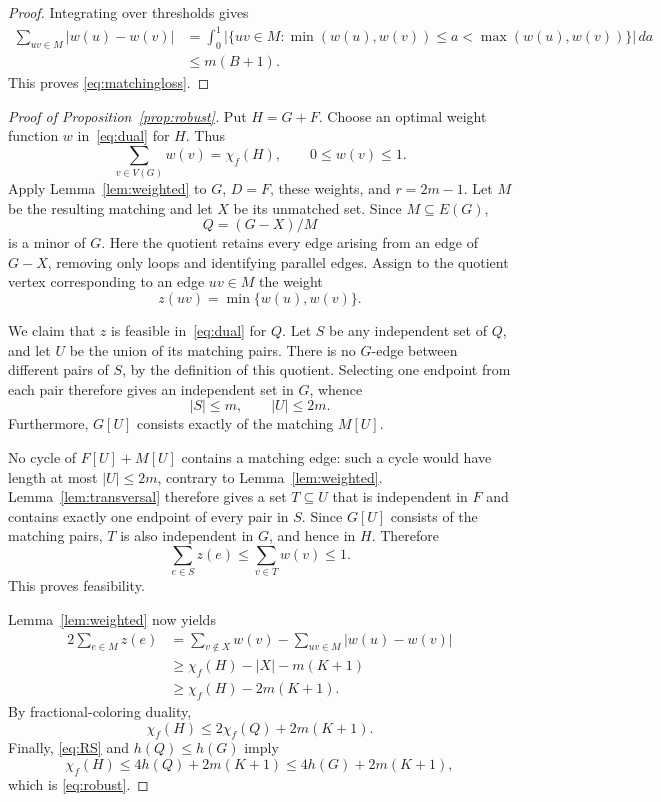 \documentclass[11pt]{article}
\begin{document}
\begin{proof}
Integrating over thresholds gives \[
\begin{aligned}
\sum_{uv\in M}|w(u)-w(v)|
&=\int_0^1
\bigl|\{uv\in M:\min(w(u),w(v))\le a<\max(w(u),w(v))\}\bigr|\,da\\
&\le m(B+1).
\end{aligned}
\] This proves \eqref{eq:matchingloss}. \end{proof}

\begin{proof}[Proof of Proposition~\ref{prop:robust}] Put \(H=G+F\). Choose an optimal
 weight function \(w\) in~\eqref{eq:dual} for \(H\). Thus \[
\sum_{v\in V(G)}w(v)=\chi_f(H),\qquad 0\le w(v)\le1.
\] Apply Lemma~\ref{lem:weighted} to \(G\), \(D=F\), these weights, and \(r=2m-1\). Let
 \(M\) be the resulting matching and let \(X\) be its unmatched set. Since \(M\subseteq
 E(G)\), \[
Q=(G-X)/M
\] is a minor of \(G\). Here the quotient retains every edge arising from an edge of
 \(G-X\), removing only loops and identifying parallel edges. Assign to the quotient
 vertex corresponding to an edge \(uv\in M\) the weight \[
z(uv)=\min\{w(u),w(v)\}.
\]

We claim that \(z\) is feasible in~\eqref{eq:dual} for \(Q\). Let \(S\) be any
 independent set of \(Q\), and let \(U\) be the union of its matching pairs. There is no
 \(G\)-edge between different pairs of \(S\), by the definition of this quotient.
 Selecting one endpoint from each pair therefore gives an independent set in \(G\),
 whence \[
|S|\le m,\qquad |U|\le2m.
\] Furthermore, \(G[U]\) consists exactly of the matching \(M[U]\).

No cycle of \(F[U]+M[U]\) contains a matching edge: such a cycle would have length at
 most \(|U|\le2m\), contrary to Lemma~\ref{lem:weighted}. Lemma~\ref{lem:transversal}
 therefore gives a set \(T\subseteq U\) that is independent in \(F\) and contains
 exactly one endpoint of every pair in \(S\). Since \(G[U]\) consists of the matching
 pairs, \(T\) is also independent in \(G\), and hence in \(H\). Therefore \[
\sum_{e\in S}z(e)\le\sum_{v\in T}w(v)\le1.
\] This proves feasibility.

Lemma~\ref{lem:weighted} now yields \[
\begin{aligned}
2\sum_{e\in M}z(e)
&=\sum_{v\notin X}w(v)-\sum_{uv\in M}|w(u)-w(v)|\\
&\ge\chi_f(H)-|X|-m(K+1)\\
&\ge\chi_f(H)-2m(K+1).
\end{aligned}
\] By fractional-coloring duality, \[
\chi_f(H)\le2\chi_f(Q)+2m(K+1).
\] Finally, \eqref{eq:RS} and \(h(Q)\le h(G)\) imply \[
\chi_f(H)\le4h(Q)+2m(K+1)\le4h(G)+2m(K+1),
\] which is \eqref{eq:robust}. \end{proof}
\end{document}
